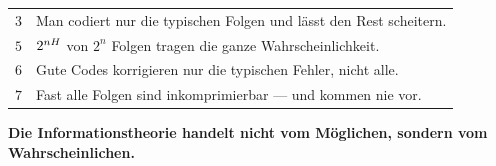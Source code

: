 \begin{merksatz}
\begin{center}
{\small
\renewcommand{\arraystretch}{1.48}
\begin{tabular}{@{}P{1.8cm}P{6.6cm}@{}}
\toprule
$3$ & Man codiert nur die typischen Folgen und lässt den Rest scheitern.\\
$5$ & $2^{nH}$ von $2^{n}$ Folgen tragen die ganze Wahrscheinlichkeit.\\
$6$ & Gute Codes korrigieren nur die typischen Fehler, nicht alle.\\
$7$ & Fast alle Folgen sind inkomprimierbar --- und kommen nie vor.\\
\bottomrule
\end{tabular}}
\end{center}

\begin{center}
\begin{minipage}{0.9\textwidth}
\textbf{Die Informationstheorie handelt nicht vom Möglichen, sondern vom Wahrscheinlichen.}
\end{minipage}
\end{center}

\begin{center}
\begin{minipage}{0.88\textwidth}
\end{minipage}
\end{center}
\end{merksatz}

